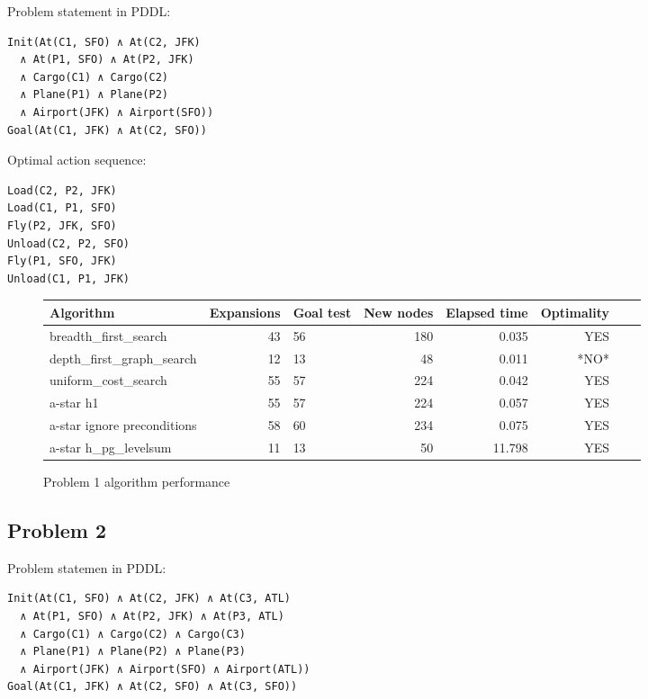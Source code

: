 \documentclass[12pt, a4paper]{article}
\begin{document}
Problem statement in PDDL:
\begin{verbatim}
Init(At(C1, SFO) ∧ At(C2, JFK)
  ∧ At(P1, SFO) ∧ At(P2, JFK)
  ∧ Cargo(C1) ∧ Cargo(C2)
  ∧ Plane(P1) ∧ Plane(P2)
  ∧ Airport(JFK) ∧ Airport(SFO))
Goal(At(C1, JFK) ∧ At(C2, SFO))
\end{verbatim}

Optimal action sequence:
\begin{verbatim}
Load(C2, P2, JFK)
Load(C1, P1, SFO)
Fly(P2, JFK, SFO)
Unload(C2, P2, SFO)
Fly(P1, SFO, JFK)
Unload(C1, P1, JFK)
\end{verbatim}

\begin{figure}[htbp]

\begin{tabular}{lrlrrrrl}
\toprule
{} Algorithm &  Expansions &  Goal test &  New nodes &  Elapsed time & Optimality \\
\midrule
breadth\_first\_search &          43 &         56 &        180 &      0.035 &        YES \\
depth\_first\_graph\_search &          12 &         13 &         48 &      0.011 &         *NO* \\
uniform\_cost\_search & 55 &	57 &	224 &	0.042 &	YES \\
a-star h1 &          55 &         57 &        224 &      0.057 &        YES \\
a-star ignore preconditions &          58 &         60 &        234 &      0.075 &        YES \\
a-star h\_pg\_levelsum &          11 &         13 &         50 &     11.798 &        YES \\
\bottomrule
\end{tabular}
\caption{Problem 1 algorithm performance}
\end{figure}

\subsection{Problem 2}

Problem statemen in PDDL:

\begin{verbatim}
Init(At(C1, SFO) ∧ At(C2, JFK) ∧ At(C3, ATL)
  ∧ At(P1, SFO) ∧ At(P2, JFK) ∧ At(P3, ATL)
  ∧ Cargo(C1) ∧ Cargo(C2) ∧ Cargo(C3)
  ∧ Plane(P1) ∧ Plane(P2) ∧ Plane(P3)
  ∧ Airport(JFK) ∧ Airport(SFO) ∧ Airport(ATL))
Goal(At(C1, JFK) ∧ At(C2, SFO) ∧ At(C3, SFO))
\end{verbatim}
\end{document}
